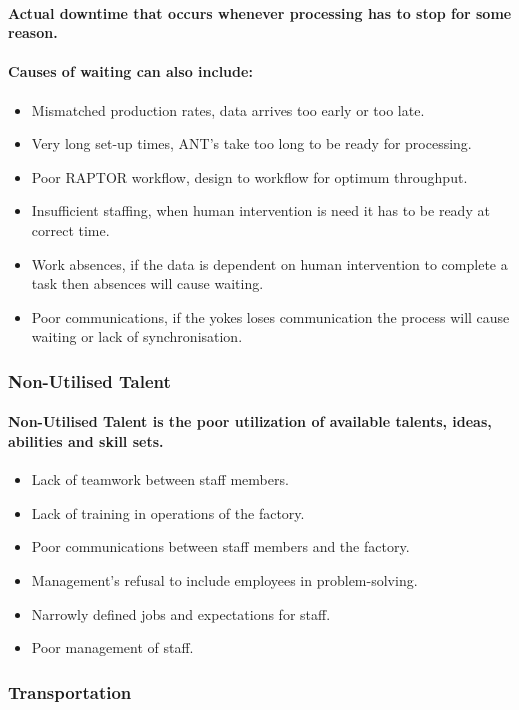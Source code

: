 \documentclass{acm_proc_article-sp}
\begin{document}
\paragraph{Actual downtime that occurs whenever processing has to stop for some reason.}
\paragraph{Causes of waiting can also include:}
\begin{itemize}
\item Mismatched production rates, data arrives too early or too late.
\item Very long set-up times, ANT's take too long to be ready for processing.
\item Poor RAPTOR workflow, design to workflow for optimum throughput.
\item Insufficient staffing, when human intervention is need it has to be ready at correct time.
\item Work absences, if the data is dependent on human intervention to complete a task then absences will cause waiting.
\item Poor communications, if the yokes loses communication the process will cause waiting or lack of synchronisation.
\end{itemize}
\subsubsection{Non-Utilised Talent}
\paragraph{Non-Utilised Talent is the poor utilization of available talents, ideas, abilities and skill sets.}
\begin{itemize}
\item Lack of teamwork between staff members.
\item Lack of training in operations of the factory.
\item Poor communications between staff members and the factory.
\item Management's refusal to include employees in problem-solving.
\item Narrowly defined jobs and expectations for staff.
\item Poor management of staff.
\end{itemize}
\subsubsection{Transportation}
\end{document}
